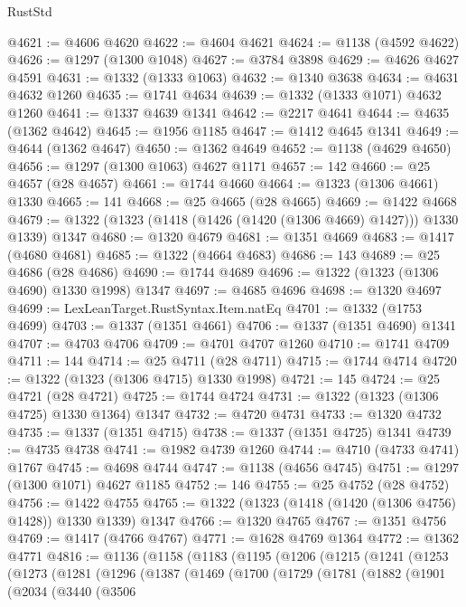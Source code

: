 \begin{lexlean}{RustStd}
\begin{coremodule}
@4621 := @4606 @4620
@4622 := @4604 @4621
@4624 := @1138 (@4592 @4622)
@4626 := @1297 (@1300 @1048)
@4627 := @3784 @3898
@4629 := @4626 @4627 @4591
@4631 := @1332 (@1333 @1063)
@4632 := @1340 @3638
@4634 := @4631 @4632 @1260
@4635 := @1741 @4634
@4639 := @1332 (@1333 @1071) @4632 @1260
@4641 := @1337 @4639 @1341
@4642 := @2217 @4641
@4644 := @4635 (@1362 @4642)
@4645 := @1956 @1185
@4647 := @1412 @4645 @1341
@4649 := @4644 (@1362 @4647)
@4650 := @1362 @4649
@4652 := @1138 (@4629 @4650)
@4656 := @1297 (@1300 @1063) @4627 @1171
@4657 := 142
@4660 := @25 @4657 (@28 @4657)
@4661 := @1744 @4660
@4664 := @1323 (@1306 @4661) @1330
@4665 := 141
@4668 := @25 @4665 (@28 @4665)
@4669 := @1422 @4668
@4679 := @1322 (@1323 (@1418 (@1426 (@1420 (@1306 @4669) @1427))) @1330 @1339) @1347
@4680 := @1320 @4679
@4681 := @1351 @4669
@4683 := @1417 (@4680 @4681)
@4685 := @1322 (@4664 @4683)
@4686 := 143
@4689 := @25 @4686 (@28 @4686)
@4690 := @1744 @4689
@4696 := @1322 (@1323 (@1306 @4690) @1330 @1998) @1347
@4697 := @4685 @4696
@4698 := @1320 @4697
@4699 := LexLeanTarget.RustSyntax.Item.natEq
@4701 := @1332 (@1753 @4699)
@4703 := @1337 (@1351 @4661)
@4706 := @1337 (@1351 @4690) @1341
@4707 := @4703 @4706
@4709 := @4701 @4707 @1260
@4710 := @1741 @4709
@4711 := 144
@4714 := @25 @4711 (@28 @4711)
@4715 := @1744 @4714
@4720 := @1322 (@1323 (@1306 @4715) @1330 @1998)
@4721 := 145
@4724 := @25 @4721 (@28 @4721)
@4725 := @1744 @4724
@4731 := @1322 (@1323 (@1306 @4725) @1330 @1364) @1347
@4732 := @4720 @4731
@4733 := @1320 @4732
@4735 := @1337 (@1351 @4715)
@4738 := @1337 (@1351 @4725) @1341
@4739 := @4735 @4738
@4741 := @1982 @4739 @1260
@4744 := @4710 (@4733 @4741) @1767
@4745 := @4698 @4744
@4747 := @1138 (@4656 @4745)
@4751 := @1297 (@1300 @1071) @4627 @1185
@4752 := 146
@4755 := @25 @4752 (@28 @4752)
@4756 := @1422 @4755
@4765 := @1322 (@1323 (@1418 (@1420 (@1306 @4756) @1428)) @1330 @1339) @1347
@4766 := @1320 @4765
@4767 := @1351 @4756
@4769 := @1417 (@4766 @4767)
@4771 := @1628 @4769 @1364
@4772 := @1362 @4771
@4816 := @1136
    (@1158
      (@1183
        (@1195
          (@1206
            (@1215
              (@1241
                (@1253
                  (@1273
                    (@1281
                      (@1296
                        (@1387
                          (@1469
                            (@1700
                              (@1729
                                (@1781
                                  (@1882
                                    (@1901
                                      (@2034
                                        (@3440
                                          (@3506

\end{coremodule}
\end{lexlean}
